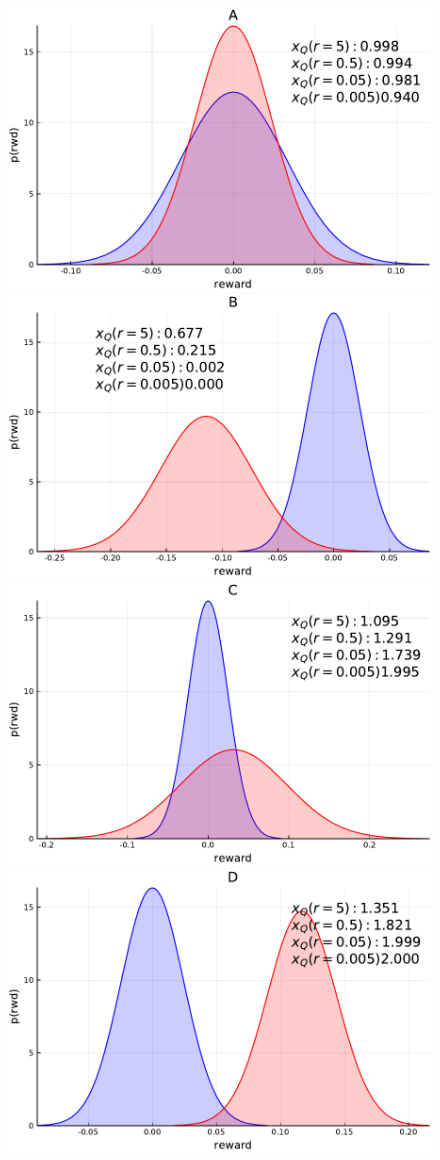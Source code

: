 \begin{figure}[tbp]
    \centering
    \includegraphics[width=0.9\linewidth]{Figures/p2}
    \includegraphics[width=0.9\linewidth]{Figures/p3}
    \includegraphics[width=0.9\linewidth]{Figures/p4}
    \includegraphics[width=0.9\linewidth]{Figures/p5}

\end{figure}

